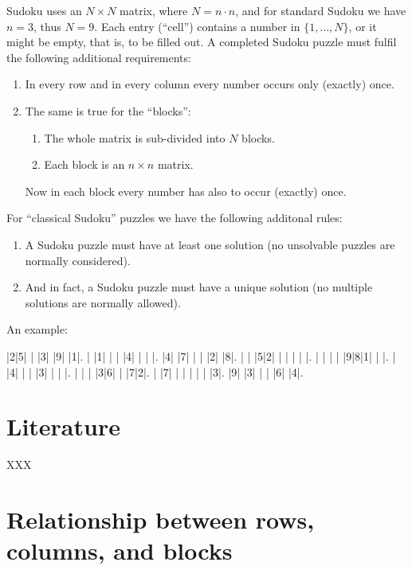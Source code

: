 \documentclass[11pt]{report}
\begin{document}
Sudoku uses an $N \times N$ matrix, where $N = n \cdot n$, and for standard Sudoku we have $n = 3$, thus $N = 9$. Each entry (``cell'') contains a number in $\{1, \dots, N\}$, or it might be empty, that is, to be filled out. A completed Sudoku puzzle must fulfil the following additional requirements:
\begin{enumerate}
\item In every row and in every column every number occurs only (exactly) once.
\item The same is true for the ``blocks'':
  \begin{enumerate}
  \item The whole matrix is sub-divided into $N$ blocks.
  \item Each block is an $n \times n$ matrix.
  \end{enumerate}
  Now in each block every number has also to occur (exactly) once.
\end{enumerate}
For ``classical Sudoku'' puzzles we have the following additonal rules:
\begin{enumerate}
\item A Sudoku puzzle must have at least one solution (no unsolvable puzzles are normally considered).
\item And in fact, a Sudoku puzzle must have a unique solution (no multiple solutions are normally allowed).
\end{enumerate}
An example:
\setlength\sudokusize{7cm}

\begin{sudoku}
  |2|5| | |3| |9| |1|.
  | |1| | | |4| | | |.
  |4| |7| | | |2| |8|.
  | | |5|2| | | | | |.
  | | | | |9|8|1| | |.
  | |4| | | |3| | | |.
  | | | |3|6| | |7|2|.
  | |7| | | | | | |3|.
  |9| |3| | | |6| |4|.
\end{sudoku}



\section{Literature}
\label{sec:introLiterature}

\cite{Berthier2007Sudoku} XXX


\section{Relationship between rows, columns, and blocks}
\label{sec:Relationship}








\end{document}

